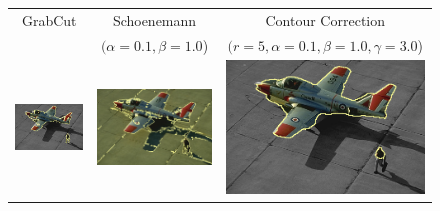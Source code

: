 \documentclass[smallextended]{svjour3}       %
\begin{document}
{{\begin{figure}[hp!]
	\center
	\begin{tabular}{ccc}
		GrabCut & Schoenemann & Contour Correction \\
		& $(\alpha=0.1, \beta=1.0$) & $(r=5, \alpha=0.1, \beta=1.0, \gamma=3.0$)\\
		\includegraphics[scale=0.2]{segmentation_bc_airplane2_gc-seg.png} &
		\includegraphics[scale=0.2]{segmentation_schoenemann_airplane2_airplane2-seg.png} &
		\includegraphics[scale=0.2]{segmentation_bc_airplane2_corrected-seg.png}\\						

\end{tabular}
\end{figure}}}
\end{document}
